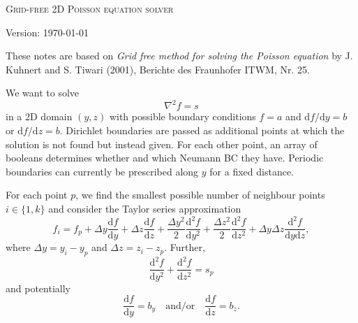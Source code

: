 \documentclass{article}
\begin{document}
	
	\pagestyle{plain}
	
\begin{center}
	\Large
	\textsc{Grid-free 2D Poisson equation solver}
	
	\large
	Version: \today
\end{center}

These notes are based on 
\emph{Grid free method for solving the Poisson equation} by J. Kuhnert and S. Tiwari (2001), Berichte des Fraunhofer ITWM, Nr. 25.


We want to solve
\begin{equation}
\nabla^2 f = s
\end{equation}
in a 2D domain $(y,z)$
with possible boundary conditions $f=a$ and $\mathrm{d}f/\mathrm{d}y=b$ or $\mathrm{d}f/\mathrm{d}z=b$.
Dirichlet boundaries are passed as additional points at which the solution is not found but instead given.
For each other point, an array of booleans determines whether and which Neumann BC they have.
Periodic boundaries can currently be prescribed along $y$ for a fixed distance.

For each point $p$, we find the smallest possible number of neighbour points $i\in \{1,k \}$ and consider the Taylor series approximation
\begin{equation}
f_i = f_p 
+ \Delta y \frac{\mathrm{d}f}{\mathrm{d}y}
+ \Delta z \frac{\mathrm{d}f}{\mathrm{d}z}
+ \frac{\Delta y^2}{2} \frac{\mathrm{d}^2f}{\mathrm{d}y^2}
+ \frac{\Delta z^2}{2} \frac{\mathrm{d}^2f}{\mathrm{d}z^2}
+ \Delta y \Delta z \frac{\mathrm{d}^2f}{\mathrm{d}y \mathrm{d}z},
\end{equation}
where $\Delta y = y_i - y_p$ and $\Delta z = z_i - z_p$. 
Further,
\begin{equation}
\frac{\mathrm{d}^2f}{\mathrm{d}y^2} +  \frac{\mathrm{d}^2f}{\mathrm{d}z^2} = s_p
\end{equation}
and potentially
\begin{equation}
\frac{\mathrm{d}f}{\mathrm{d}y} = b_y \quad \mathrm{and/or} \quad \frac{\mathrm{d}f}{\mathrm{d}z}=b_z.
\end{equation}
\end{document}
